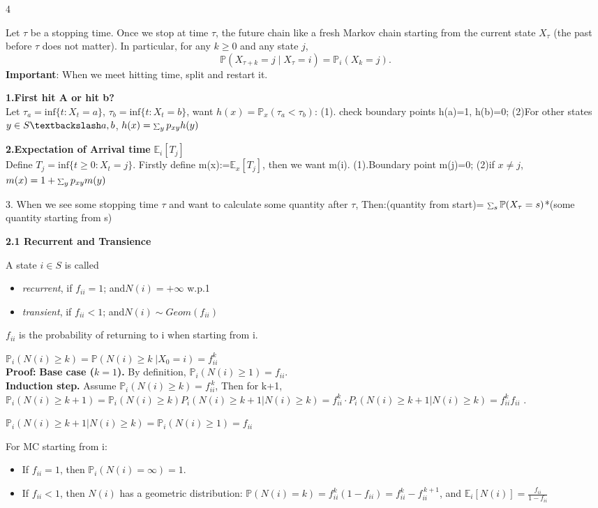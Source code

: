 \documentclass[a4paper, landscape]{article}
\newcommand{\topic}[1]{\par\medskip\textbf{#1}\par}
\newcommand{\subtopic}[1]{\par\textbf{#1}}
\newcommand{\smallsum}{\mathop{\scalebox{0.65}{$\sum$}}\nolimits}
\renewcommand{\topic}[1]{\par\medskip\noindent\colorbox{highlightcolor}{\parbox{\dimexpr\columnwidth-2\fboxsep\relax}{\textbf{#1}}}\par}
\renewcommand{\subtopic}[1]{\par\textbf{\color{blue}{#1}}} %
\begin{document}
\begin{multicols}{4}
\subtopic{Strong Markov Property}
Let $\tau$ be a stopping time. Once we stop at time $\tau$, the future chain like a fresh Markov chain starting from the current state $X_\tau$ (the past before $\tau$
does not matter).
In particular, for any $k\ge 0$ and any state $j$,
\[
\mathbb P(X_{\tau+k}=j \mid X_\tau=i)=\mathbb P_i(X_k=j).
\]
\textbf{Important}: When we meet hitting time, split and restart it.
\par \textbf{1.First hit A or hit b?}\\
Let $\tau_a= \text{inf}\{t:X_t=a\}$, $\tau_b= \text{inf}\{t:X_t=b\}$, want $h(x)=\mathbb P_x(\tau_a<\tau_b)$: (1). check boundary points h(a)=1, h(b)=0; (2)For other states $y\in S\textbackslash a,b$, $h(x)=\smallsum_y p_{xy}h(y)$ 
\par \textbf{2.Expectation of Arrival time} $\mathbb E_i[T_j]$\\
Define $T_j=\text{inf}\{t\geq0: X_t=j\}$. Firstly define m(x):=$\mathbb E_x[T_j]$, then we want m(i). (1).Boundary point m(j)=0; (2)if $x\neq j$,$m(x)=1+\smallsum_y p_{xy}m(y)$
\par 3. When we see some stopping time $\tau$ and want to calculate some quantity after $\tau$, Then:(quantity from start)= $\smallsum_s \mathbb P(X_\tau=s)$*(some quantity starting from s)

\topic{2.1 Recurrent and Transience}
\subtopic{one state Recurrent \& Transience:}A state $i\in S$ is called
\begin{itemize}
    \item \emph{recurrent}, if $f_{ii}=1$; and$ N(i)=+\infty$ w.p.1
    \item \emph{transient}, if $f_{ii}<1$; and$ N(i)\sim Geom(f_{ii})$ 
\end{itemize}
$f_{ii}$ is the probability of returning to i when starting from i.

\subtopic{Fact:} $\mathbb P_i(N(i)\ge k) =\mathbb P(N(i)\ge k \;|X_0=i)= f_{ii}^k$\\
\textbf{Proof:} \textbf{Base case ($k=1$).}
By definition, $\mathbb P_i(N(i)\ge1)=f_{ii}$.\\
\textbf{Induction step.} Assume $\mathbb P_i(N(i)\ge k)=f_{ii}^{\,k}$, Then for k+1, $\mathbb P_i(N(i)\ge k+1)=\mathbb P_i(N(i)\ge k)P_i(N(i)\ge k+1|N(i)\ge k)=f_{ii}^k\cdot P_i(N(i)\ge k+1|N(i)\ge k) = f_{ii}^k f_{ii}$ .

\subtopic{Refresh Markov Chain:} $\mathbb P_i(N(i)\ge k+1|N(i)\ge k)= \mathbb P_i(N(i)\ge 1)= f_{ii}$

\subtopic{Conclusion for $f_{ii}$:} For MC starting from i:
\begin{itemize}
    \item If $f_{ii}=1$, then $\mathbb P_i(N(i)=\infty)=1$. 
    \item If $f_{ii}<1$, then $N(i)$ has a geometric distribution: $\mathbb P(N(i)=k)=f_{ii}^k(1-f_{ii})= f_{ii}^k-f_{ii}^{\,k+1}$, and $\mathbb E_i[N(i)]=\frac{f_{ii}}{1-f_{ii}}$
\end{itemize}



\end{multicols}
\end{document}
